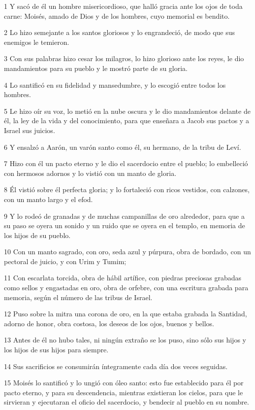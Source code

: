 \par 1 Y sacó de él un hombre misericordioso, que halló gracia ante los ojos de toda carne: Moisés, amado de Dios y de los hombres, cuyo memorial es bendito.
\par 2 Lo hizo semejante a los santos gloriosos y lo engrandeció, de modo que sus enemigos le temieron.
\par 3 Con sus palabras hizo cesar los milagros, lo hizo glorioso ante los reyes, le dio mandamientos para su pueblo y le mostró parte de su gloria.
\par 4 Lo santificó en su fidelidad y mansedumbre, y lo escogió entre todos los hombres.
\par 5 Le hizo oír su voz, lo metió en la nube oscura y le dio mandamientos delante de él, la ley de la vida y del conocimiento, para que enseñara a Jacob sus pactos y a Israel sus juicios.
\par 6 Y ensalzó a Aarón, un varón santo como él, su hermano, de la tribu de Leví.
\par 7 Hizo con él un pacto eterno y le dio el sacerdocio entre el pueblo; lo embelleció con hermosos adornos y lo vistió con un manto de gloria.
\par 8 Él vistió sobre él perfecta gloria; y lo fortaleció con ricos vestidos, con calzones, con un manto largo y el efod.
\par 9 Y lo rodeó de granadas y de muchas campanillas de oro alrededor, para que a su paso se oyera un sonido y un ruido que se oyera en el templo, en memoria de los hijos de su pueblo.
\par 10 Con un manto sagrado, con oro, seda azul y púrpura, obra de bordado, con un pectoral de juicio, y con Urim y Tumim;
\par 11 Con escarlata torcida, obra de hábil artífice, con piedras preciosas grabadas como sellos y engastadas en oro, obra de orfebre, con una escritura grabada para memoria, según el número de las tribus de Israel.
\par 12 Puso sobre la mitra una corona de oro, en la que estaba grabada la Santidad, adorno de honor, obra costosa, los deseos de los ojos, buenos y bellos.
\par 13 Antes de él no hubo tales, ni ningún extraño se los puso, sino sólo sus hijos y los hijos de sus hijos para siempre.
\par 14 Sus sacrificios se consumirán íntegramente cada día dos veces seguidas.
\par 15 Moisés lo santificó y lo ungió con óleo santo: esto fue establecido para él por pacto eterno, y para su descendencia, mientras existieran los cielos, para que le sirvieran y ejecutaran el oficio del sacerdocio, y bendecir al pueblo en su nombre.
